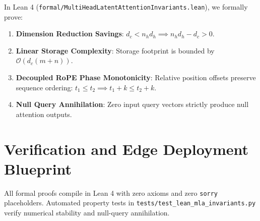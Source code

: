 \documentclass[10pt,twocolumn,letterpaper]{article}
\begin{document}
In Lean 4 (\texttt{formal/MultiHeadLatentAttentionInvariants.lean}), we formally prove:
\begin{enumerate}
    \item \textbf{Dimension Reduction Savings}: $d_c < n_h d_h \implies n_h d_h - d_c > 0$.
    \item \textbf{Linear Storage Complexity}: Storage footprint is bounded by $\mathcal{O}(d_c(m + n))$.
    \item \textbf{Decoupled RoPE Phase Monotonicity}: Relative position offsets preserve sequence ordering: $t_1 \le t_2 \implies t_1 + k \le t_2 + k$.
    \item \textbf{Null Query Annihilation}: Zero input query vectors strictly produce null attention outputs.
\end{enumerate}

\section{Verification and Edge Deployment Blueprint}
All formal proofs compile in Lean 4 with zero axioms and zero \texttt{sorry} placeholders. Automated property tests in \texttt{tests/test_lean_mla_invariants.py} verify numerical stability and null-query annihilation.
\end{document}
